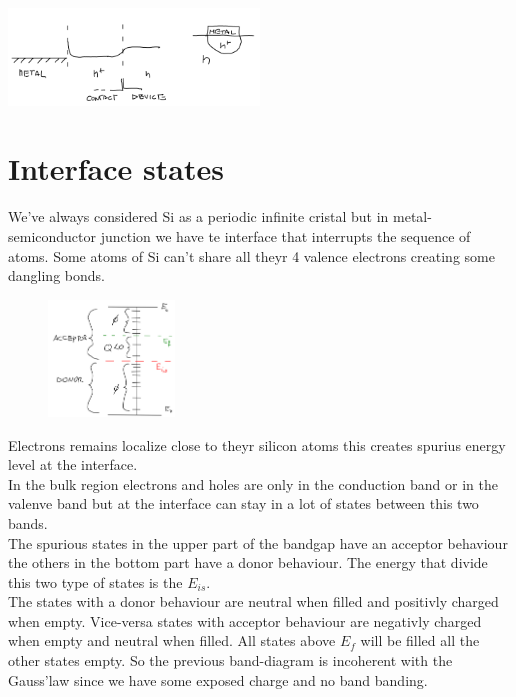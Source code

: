 \centering
\includegraphics[width=0.5\textwidth]{ohmicconctact.png}\\
\raggedright

\section{Interface states}

We've always considered Si as a periodic infinite cristal but in metal-semiconductor junction we have te interface that interrupts the sequence of atoms. Some atoms of Si can't share all theyr 4 valence electrons creating some dangling bonds.\\

\begin{figure}
\includegraphics[width=0.3\textwidth]{is01.png}
\end{figure}

Electrons remains localize close to theyr silicon atoms this creates spurius energy level at the interface.\\ 
In the bulk region electrons and holes are only in the conduction band or in the valenve band but at the interface can stay in a lot of states between this two bands.\\
The spurious states in the upper part of the bandgap have an acceptor behaviour the others in the bottom part have a donor behaviour. The energy that divide this two type of states is the $E_{is}$.\\
The states with a donor behaviour are neutral when filled and positivly charged when empty. Vice-versa states with acceptor behaviour are negativly charged when empty and neutral when filled. All states above $E_f$ will be filled all the other states empty. So the previous band-diagram is incoherent with the Gauss'law since we have some exposed charge and no band banding.\\ 

